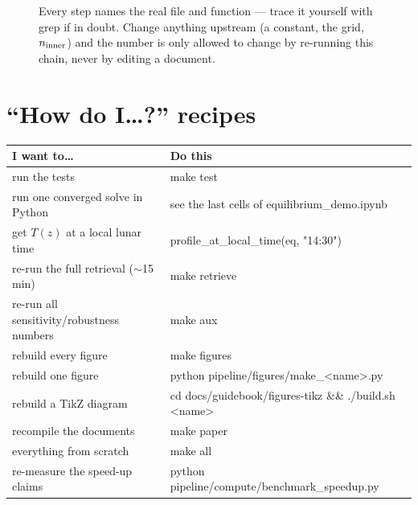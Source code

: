 \documentclass[11pt]{article}
\newcommand{\code}[1]{{\ttfamily\small #1}}
\begin{document}
\begin{figure}[h]
\caption{Every step names the real file and function --- trace it yourself
with \code{grep} if in doubt. Change anything upstream (a constant, the grid,
$n_{\rm inner}$) and the number is only allowed to change by re-running this
chain, never by editing a document.}
\label{fig:trace}
\end{figure}

\section{``How do I\ldots?'' recipes}

\begin{center}\small
\begin{tabularx}{\textwidth}{@{}X >{\ttfamily\small}l@{}}
\toprule
\textnormal{\textbf{I want to\ldots}} & \textnormal{\textbf{Do this}} \\
\midrule
run the tests & make test \\
run one converged solve in Python & see the last cells of equilibrium\_demo.ipynb \\
get $T(z)$ at a local lunar time & profile\_at\_local\_time(eq, "14:30") \\
re-run the full retrieval ($\sim$15 min) & make retrieve \\
re-run all sensitivity/robustness numbers & make aux \\
rebuild every figure & make figures \\
rebuild one figure & python pipeline/figures/make\_<name>.py \\
rebuild a TikZ diagram & cd docs/guidebook/figures-tikz \&\& ./build.sh <name> \\
recompile the documents & make paper \\
everything from scratch & make all \\
re-measure the speed-up claims & python pipeline/compute/benchmark\_speedup.py \\
\bottomrule
\end{tabularx}
\end{center}
\end{document}

